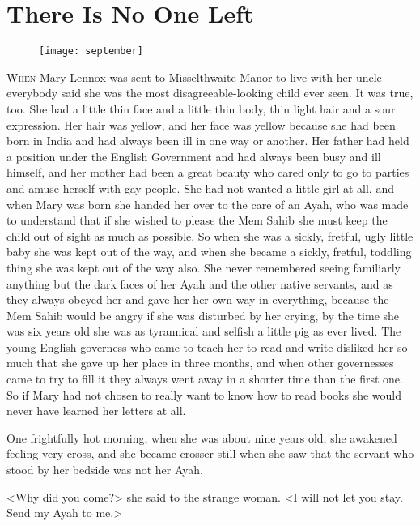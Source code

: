 \chapter{There Is No One Left}
	
\begin{figure}[t!]
\centering
\texttt{[image: september]}
\end{figure}

 \lettrine[]{W}{hen} Mary Lennox was sent to Misselthwaite Manor to live with her uncle everybody said she was the most dis\-agree\-able-looking child ever seen. It was true, too. She had a little thin face and a little thin body, thin light hair and a sour expression. Her hair was yellow, and her face was yellow because she had been born in India and had always been ill in one way or another. Her father had held a position under the English Government and had always been busy and ill himself, and her mother had been a great beauty who cared only to go to parties and amuse herself with gay people. She had not wanted a little girl at all, and when Mary was born she handed her over to the care of an Ayah, who was made to understand that if she wished to please the Mem Sahib she must keep the child out of sight as much as possible. So when she was a sickly, fretful, ugly little baby she was kept out of the way, and when she became a sickly, fretful, toddling thing she was kept out of the way also. She never remembered seeing familiarly anything but the dark faces of her Ayah and the other native servants, and as they always obeyed her and gave her her own way in everything, because the Mem Sahib would be angry if she was disturbed by her crying, by the time she was six years old she was as tyrannical and selfish a little pig as ever lived. The young English governess who came to teach her to read and write disliked her so much that she gave up her place in three months, and when other governesses came to try to fill it they always went away in a shorter time than the first one. So if Mary had not chosen to really want to know how to read books she would never have learned her letters at all.

One frightfully hot morning, when she was about nine years old, she awakened feeling very cross, and she became crosser still when she saw that the servant who stood by her bedside was not her Ayah.

<Why did you come?> she said to the strange woman. <I will not let you stay. Send my Ayah to me.>

